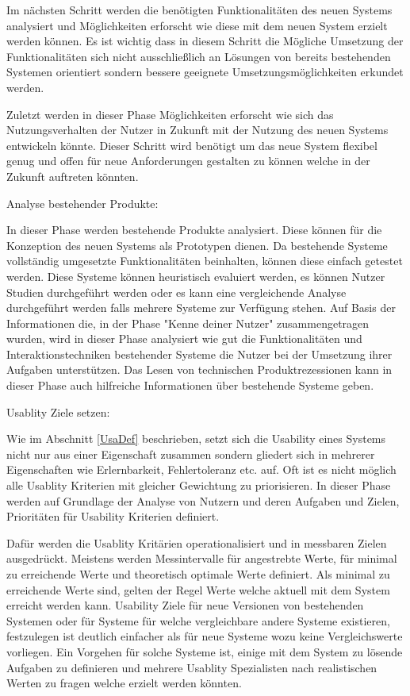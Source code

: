 Im nächsten Schritt werden die benötigten Funktionalitäten des neuen Systems analysiert und Möglichkeiten erforscht wie diese mit dem neuen System erzielt werden können. 
Es ist wichtig dass in diesem Schritt die Mögliche Umsetzung der Funktionalitäten sich nicht ausschließlich an Lösungen von bereits bestehenden Systemen orientiert sondern 
bessere geeignete Umsetzungsmöglichkeiten erkundet werden.

Zuletzt werden in dieser Phase Möglichkeiten erforscht wie sich das Nutzungsverhalten der Nutzer in Zukunft mit der Nutzung des neuen Systems entwickeln könnte. Dieser Schritt wird  
benötigt um das neue System flexibel genug und offen für neue Anforderungen  gestalten zu können welche in der Zukunft auftreten könnten. %


Analyse bestehender Produkte: 

In dieser Phase werden bestehende Produkte analysiert. Diese können für die Konzeption des neuen Systems als Prototypen dienen. Da bestehende Systeme vollständig 
umgesetzte Funktionalitäten beinhalten, können diese einfach getestet werden.    
Diese Systeme können heuristisch evaluiert werden, es können Nutzer Studien durchgeführt werden oder es kann eine vergleichende Analyse durchgeführt werden falls mehrere Systeme zur 
Verfügung stehen. Auf Basis der Informationen die, in der Phase "Kenne deiner Nutzer" zusammengetragen wurden, wird in dieser Phase analysiert wie gut die  Funktionalitäten und Interaktionstechniken 
bestehender Systeme die Nutzer bei der Umsetzung ihrer Aufgaben unterstützen. Das Lesen von technischen Produktrezessionen kann in dieser Phase auch hilfreiche Informationen über bestehende Systeme geben. 

Usablity Ziele setzen: 

Wie im Abschnitt \ref{UsaDef} beschrieben, setzt sich die Usability eines Systems nicht nur aus einer Eigenschaft zusammen sondern gliedert sich in mehrerer Eigenschaften wie Erlernbarkeit, Fehlertoleranz etc. auf. 
Oft ist es nicht möglich alle Usablity Kriterien mit gleicher Gewichtung zu priorisieren. In dieser Phase werden auf Grundlage der Analyse von Nutzern und deren Aufgaben und Zielen, Prioritäten für Usability Kriterien definiert. 

Dafür werden die Usablity Kritärien operationalisiert und in messbaren Zielen ausgedrückt. Meistens werden Messintervalle für angestrebte Werte, für minimal zu erreichende Werte und theoretisch optimale Werte definiert. 
Als minimal zu erreichende Werte sind, gelten der Regel Werte welche aktuell mit dem System erreicht werden kann. Usability Ziele für neue Versionen von bestehenden Systemen oder für Systeme für welche vergleichbare andere 
Systeme existieren, festzulegen ist deutlich einfacher als für neue Systeme wozu keine Vergleichswerte vorliegen. Ein Vorgehen für solche Systeme ist, einige mit dem System zu lösende Aufgaben zu definieren und mehrere Usablity Spezialisten nach realistischen Werten zu fragen welche erzielt werden könnten.

